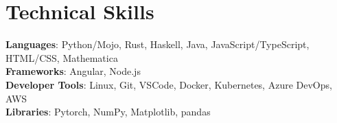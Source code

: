 \documentclass[letterpaper,11pt]{article}
\begin{document}
\section{Technical Skills}
 \begin{itemize}[leftmargin=0.15in, label={}]
    \small{\item{
      \textbf{Languages}{: Python/Mojo, Rust, Haskell, Java, JavaScript/TypeScript, HTML/CSS, Mathematica} \\
      \textbf{Frameworks}{: Angular, Node.js} \\
      \textbf{Developer Tools}{: Linux, Git, VSCode, Docker, Kubernetes, Azure DevOps, AWS} \\
      \textbf{Libraries}{: Pytorch, NumPy, Matplotlib, pandas}
    }}
 \end{itemize}


\end{document}
